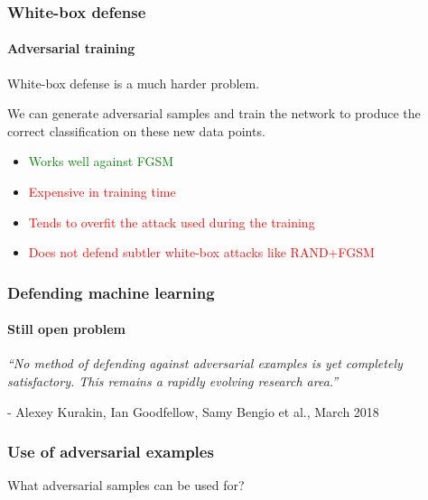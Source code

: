 \documentclass[9pt]{beamer}
\begin{document}
\begin{frame}
  \frametitle{White-box defense}

  \framesubtitle{Adversarial training}

  White-box defense is a much harder problem.

  \medskip

  We can generate adversarial samples and train the network to produce
  the correct classification on these new data points.

  \medskip

  \begin{itemize}
    \item \textcolor{green}{Works well against FGSM}
    \item \textcolor{red}{Expensive in training time}
    \item \textcolor{red}{Tends to overfit the attack used during the training}
    \item \textcolor{red}{Does not defend subtler white-box attacks like RAND+FGSM}
  \end{itemize}
\end{frame}

\begin{frame}

  \frametitle{Defending machine learning}

  \framesubtitle{Still open problem}

  \textit{``No method of defending against adversarial examples is yet
    completely satisfactory. This remains a rapidly evolving research
    area.''}

  \bigskip

  - Alexey Kurakin, Ian Goodfellow, Samy Bengio et al., March 2018
\end{frame}

\begin{frame}
  \frametitle{Use of adversarial examples}

  What adversarial samples can be used for?
\end{frame}
\end{document}
